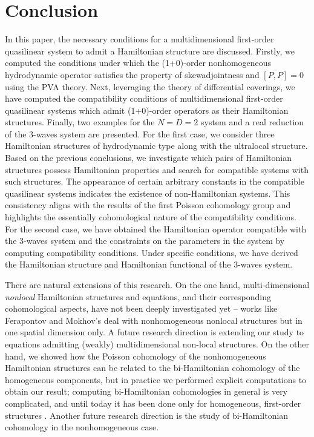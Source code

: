 \documentclass[pdftex]{sigma}
\numberwithin{equation}{section}
\begin{document}
\section{Conclusion}
In this paper, the necessary conditions for a multidimensional first-order quasilinear system to admit a Hamiltonian structure are discussed. Firstly, we computed the conditions under which the (1+0)-order nonhomogeneous hydrodynamic operator satisfies the property of skewadjointness and $[P,P]=0$ using the PVA theory. Next, leveraging the theory of differential coverings, we have computed the compatibility conditions of multidimensional first-order quasilinear systems which admit (1+0)-order operators as their Hamiltonian structures. Finally, two examples for the $N=D=2$ system and a real reduction of the 3-waves system are presented. For the first case, we consider three Hamiltonian structures of hydrodynamic type along with the ultralocal structure. Based on the previous conclusions, we investigate which pairs of Hamiltonian structures possess Hamiltonian properties and search for compatible systems with such structures. The appearance of certain arbitrary constants in the compatible quasilinear systems indicates the existence of non-Hamiltonian systems. This consistency aligns with the results of the first Poisson cohomology group and highlights the essentially cohomological nature of the compatibility conditions. For the second case, we have obtained the Hamiltonian operator compatible with the 3-waves system and the constraints on the parameters in the system by computing compatibility conditions. Under specific conditions, we have derived the Hamiltonian structure and Hamiltonian functional of the 3-waves system.

There are natural extensions of this research. On the one hand, multi-dimensional \emph{nonlocal} Hamiltonian structures and equations, and their corresponding cohomological aspects, have not been deeply investigated yet -- works like Ferapontov and Mokhov's \cite{mokhov1994hamiltonian} deal with nonhomogeneous nonlocal structures but in one spatial dimension only. A future research direction is extending our study to equations admitting (weakly) multidimensional non-local structures. On the other hand, we showed how the Poisson cohomology of the nonhomogeneous Hamiltonian structures can be related to the bi-Hamiltonian cohomology of the homogeneous components, but in practice we performed explicit computations to obtain our result; computing bi-Hamiltonian cohomologies in general is very complicated, and until today it has been done only for homogeneous, first-order structures \cite{cps16,lz05}. Another future research direction is the study of bi-Hamiltonian cohomology in the nonhomogeneous case.
\end{document}
